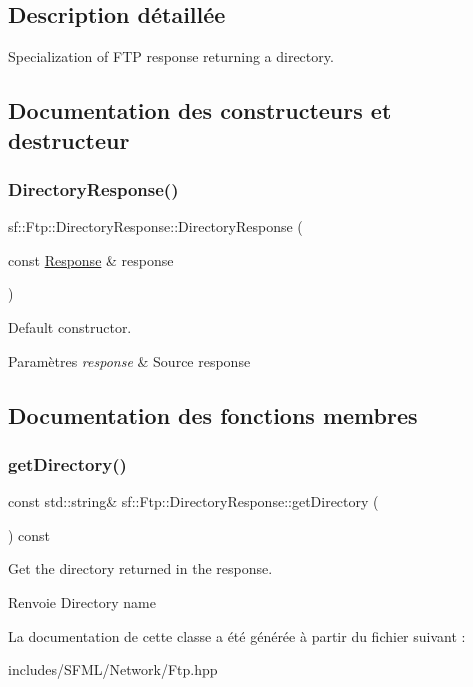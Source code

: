 \subsection{Description détaillée}
Specialization of F\+TP response returning a directory. 

\subsection{Documentation des constructeurs et destructeur}
\mbox{\label{classsf_1_1Ftp_1_1DirectoryResponse_a36b6d2728fa53c4ad37b7a6307f4d388}} 
\subsubsection{\texorpdfstring{Directory\+Response()}{DirectoryResponse()}}
{\footnotesize\ttfamily sf\+::\+Ftp\+::\+Directory\+Response\+::\+Directory\+Response (\begin{DoxyParamCaption}\item[{const \hyperlink{classsf_1_1Ftp_1_1Response}{Response} \&}]{response }\end{DoxyParamCaption})}



Default constructor. 


\begin{DoxyParams}{Paramètres}
{\em response} & Source response \\
\hline
\end{DoxyParams}


\subsection{Documentation des fonctions membres}
\mbox{\label{classsf_1_1Ftp_1_1DirectoryResponse_a311575c5c50905219025acfa73de67e2}} 
\subsubsection{\texorpdfstring{get\+Directory()}{getDirectory()}}
{\footnotesize\ttfamily const std\+::string\& sf\+::\+Ftp\+::\+Directory\+Response\+::get\+Directory (\begin{DoxyParamCaption}{ }\end{DoxyParamCaption}) const}



Get the directory returned in the response. 

\begin{DoxyReturn}{Renvoie}
Directory name 
\end{DoxyReturn}


La documentation de cette classe a été générée à partir du fichier suivant \+:\begin{DoxyCompactItemize}
\item 
includes/\+S\+F\+M\+L/\+Network/Ftp.\+hpp\end{DoxyCompactItemize}
